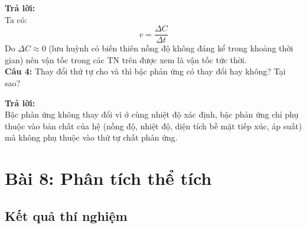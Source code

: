 \documentclass[12pt]{article}
\begin{document}
\textbf{Trả lời:}\\
Ta có:
\[
v = \frac{\Delta C}{\Delta t}
\]
Do $\Delta C \approx 0  $ (lưu huỳnh có biến thiên nồng độ không đáng kể trong khoảng thời
gian) nên vận tốc trong các TN trên được xem là vận tốc tức thời. \\
\textbf{Câu 4:} Thay đổi thứ tự cho  và  thì bậc phản ứng có thay đổi hay không? Tại sao?

\textbf{Trả lời:} \\
Bậc phản ứng không thay đổi vì ở cùng nhiệt độ xác định, bậc phản ứng chỉ phụ thuộc vào bản
chất của hệ (nồng độ, nhiệt độ, diện tích bề mặt tiếp xúc, áp suất) mà không phụ thuộc vào thứ tự chất phản ứng.
\newpage
\section{Bài 8: Phân tích thể tích}
\subsection{Kết quả thí nghiệm}
\end{document}
